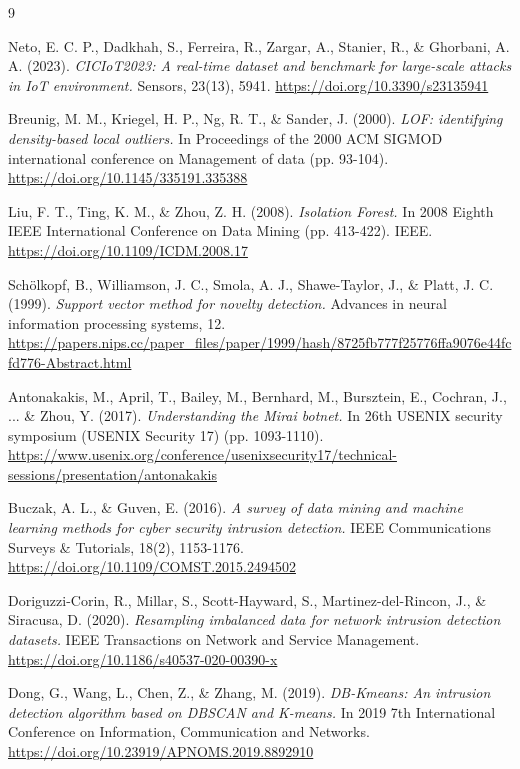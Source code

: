 \documentclass{article}
\begin{document}
\newpage

\begin{thebibliography}{9}

Neto, E. C. P., Dadkhah, S., Ferreira, R., Zargar, A., Stanier, R., \& Ghorbani, A. A. (2023). 
\textit{CICIoT2023: A real-time dataset and benchmark for large-scale attacks in IoT environment.} 
Sensors, 23(13), 5941. \url{https://doi.org/10.3390/s23135941}

Breunig, M. M., Kriegel, H. P., Ng, R. T., \& Sander, J. (2000). 
\textit{LOF: identifying density-based local outliers.} 
In Proceedings of the 2000 ACM SIGMOD international conference on Management of data (pp. 93-104). \url{https://doi.org/10.1145/335191.335388}

Liu, F. T., Ting, K. M., \& Zhou, Z. H. (2008). 
\textit{Isolation Forest.} 
In 2008 Eighth IEEE International Conference on Data Mining (pp. 413-422). IEEE. \url{https://doi.org/10.1109/ICDM.2008.17}

Schölkopf, B., Williamson, J. C., Smola, A. J., Shawe-Taylor, J., \& Platt, J. C. (1999). 
\textit{Support vector method for novelty detection.} 
Advances in neural information processing systems, 12. \url{https://papers.nips.cc/paper_files/paper/1999/hash/8725fb777f25776ffa9076e44fcfd776-Abstract.html}

Antonakakis, M., April, T., Bailey, M., Bernhard, M., Bursztein, E., Cochran, J., ... \& Zhou, Y. (2017). 
\textit{Understanding the Mirai botnet.} 
In 26th USENIX security symposium (USENIX Security 17) (pp. 1093-1110). \url{https://www.usenix.org/conference/usenixsecurity17/technical-sessions/presentation/antonakakis}

Buczak, A. L., \& Guven, E. (2016). 
\textit{A survey of data mining and machine learning methods for cyber security intrusion detection.} 
IEEE Communications Surveys \& Tutorials, 18(2), 1153-1176. \url{https://doi.org/10.1109/COMST.2015.2494502}

Doriguzzi-Corin, R., Millar, S., Scott-Hayward, S., Martinez-del-Rincon, J., \& Siracusa, D. (2020). 
\textit{Resampling imbalanced data for network intrusion detection datasets.} 
IEEE Transactions on Network and Service Management. \url{https://doi.org/10.1186/s40537-020-00390-x}

Dong, G., Wang, L., Chen, Z., \& Zhang, M. (2019). 
\textit{DB-Kmeans: An intrusion detection algorithm based on DBSCAN and K-means.} 
In 2019 7th International Conference on Information, Communication and Networks. \url{https://doi.org/10.23919/APNOMS.2019.8892910}


\end{thebibliography}
\end{document}
